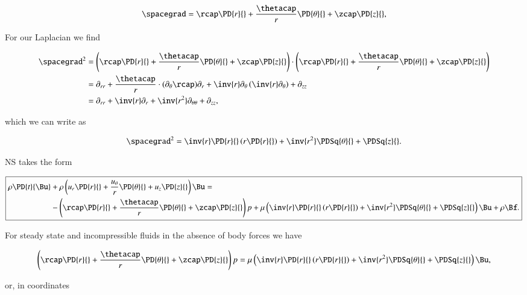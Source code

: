 \begin{equation}\label{eqn:classicalMechanicsPs2:610}
\spacegrad =
\rcap \PD{r}{} +
\frac{\thetacap}{r} \PD{\theta}{} +
\zcap \PD{z}{},
\end{equation}

For our Laplacian we find

\begin{align*}
\spacegrad^2 &=
\left(
\rcap \PD{r}{} +
\frac{\thetacap}{r} \PD{\theta}{} +
\zcap \PD{z}{}
\right)
 \cdot
\left(
\rcap \PD{r}{} +
\frac{\thetacap}{r} \PD{\theta}{} +
\zcap \PD{z}{}
\right) \\
&=
\partial_{rr}
+ \frac{\thetacap}{r} \cdot (\partial_\theta \rcap) \partial_r
+ \inv{r} \partial_\theta \left( \inv{r} \partial_\theta \right)
+ \partial_{zz} \\
&=
\partial_{rr} + \inv{r} \partial_r + \inv{r^2} \partial_{\theta\theta} + \partial_{zz},
\end{align*}

which we can write as

\begin{equation}\label{eqn:continuumL12:630}
\spacegrad^2 = \inv{r} \PD{r}{} \left( r \PD{r}{} \right) + \inv{r^2} \PDSq{\theta}{} + \PDSq{z}{}.
\end{equation}

NS takes the form

\begin{equation}\label{eqn:classicalMechanicsPs2:650}
\boxed{
\begin{aligned}
\rho \PD{t}{\Bu} &+ \rho
\left(
u_r \PD{r}{} +
\frac{u_\theta}{r} \PD{\theta}{} +
u_z \PD{z}{} \right) \Bu
=  \\
&-
\left(
\rcap \PD{r}{} +
\frac{\thetacap}{r} \PD{\theta}{} +
\zcap \PD{z}{}
\right)
p + \mu \left(
\inv{r} \PD{r}{} \left( r \PD{r}{} \right) + \inv{r^2} \PDSq{\theta}{} + \PDSq{z}{} \right)
\Bu + \rho \Bf.
\end{aligned}
}
\end{equation}

For steady state and incompressible fluids in the absence of body forces we have

\begin{equation}\label{eqn:continuumL12:670}
\left(
\rcap \PD{r}{} +
\frac{\thetacap}{r} \PD{\theta}{} +
\zcap \PD{z}{}
\right)
p = \mu \left(
\inv{r} \PD{r}{} \left( r \PD{r}{} \right) + \inv{r^2} \PDSq{\theta}{} + \PDSq{z}{} \right)
\Bu,
\end{equation}

or, in coordinates

